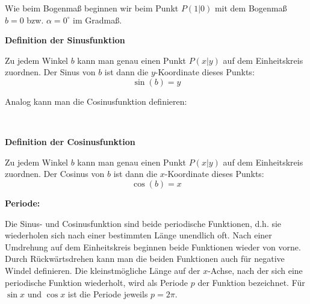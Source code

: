 Wie beim Bogenmaß beginnen wir beim Punkt \(P(1\vert 0)\) mit dem Bogenmaß \(b=0\) bzw. \(\alpha=0^\circ\) im Gradmaß.

\begin{minipage}{\textwidth}
\end{minipage}

\begin{tcolorbox}
	\textbf{Definition der Sinusfunktion}

	\textcolor{loestc}{Zu jedem Winkel \(b\) kann man genau einen Punkt \(P(x\vert y)\) auf dem Einheitskreis zuordnen. Der Sinus von \(b\) ist dann die \(y\)-Koordinate dieses Punkts:
		\[\sin\left(b\right)=y\]
	}
\end{tcolorbox}
Analog kann man die Cosinusfunktion definieren:\\
\begin{minipage}{\textwidth}
\end{minipage}\

\begin{tcolorbox}
	\textbf{Definition der Cosinusfunktion}

	\textcolor{loestc}{Zu jedem Winkel \(b\) kann man genau einen Punkt \(P(x\vert y)\) auf dem Einheitskreis zuordnen. Der Cosinus von \(b\) ist dann die \(x\)-Koordinate dieses Punkts:
		\[\cos\left(b\right)=x\]
	}
\end{tcolorbox}

\textbf{Periode:}

\textcolor{loes}{Die Sinus- und Cosinusfunktion sind beide periodische Funktionen, d.h. sie wiederholen sich nach einer bestimmten Länge unendlich oft. Nach einer Umdrehung auf dem Einheitskreis beginnen beide Funktionen wieder von vorne. Durch Rückwärtsdrehen kann man die beiden Funktionen auch für negative Windel definieren. Die kleinstmögliche Länge auf der \(x\)-Achse, nach der sich eine periodische Funktion wiederholt, wird als Periode \(p\) der Funktion bezeichnet. Für \(\sin x\) und \(\cos x\) ist die Periode jeweils \(p=2\pi\).}
